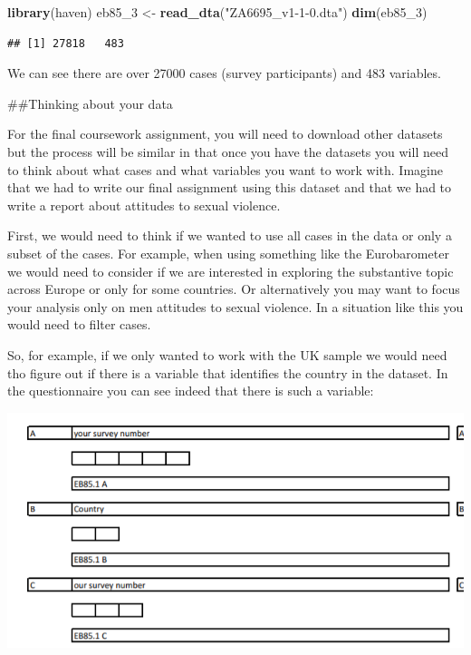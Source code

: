 \documentclass[]{book}
\newenvironment{Shaded}{\begin{snugshade}}{\end{snugshade}}
\newcommand{\DecValTok}[1]{\textcolor[rgb]{0.00,0.00,0.81}{#1}}
\newcommand{\KeywordTok}[1]{\textcolor[rgb]{0.13,0.29,0.53}{\textbf{#1}}}
\newcommand{\NormalTok}[1]{#1}
\newcommand{\StringTok}[1]{\textcolor[rgb]{0.31,0.60,0.02}{#1}}
\theoremstyle{definition}
\theoremstyle{definition}
\theoremstyle{definition}
\theoremstyle{remark}
\begin{document}
\begin{Shaded}
\begin{Highlighting}[]
\KeywordTok{library}\NormalTok{(haven)}
\NormalTok{eb85_}\DecValTok{3}\NormalTok{ <-}\StringTok{ }\KeywordTok{read_dta}\NormalTok{(}\StringTok{"ZA6695_v1-1-0.dta"}\NormalTok{)}
\KeywordTok{dim}\NormalTok{(eb85_}\DecValTok{3}\NormalTok{)}
\end{Highlighting}
\end{Shaded}

\begin{verbatim}
## [1] 27818   483
\end{verbatim}

We can see there are over 27000 cases (survey participants) and 483
variables.

\#\#Thinking about your data

For the final coursework assignment, you will need to download other
datasets but the process will be similar in that once you have the
datasets you will need to think about what cases and what variables you
want to work with. Imagine that we had to write our final assignment
using this dataset and that we had to write a report about attitudes to
sexual violence.

First, we would need to think if we wanted to use all cases in the data
or only a subset of the cases. For example, when using something like
the Eurobarometer we would need to consider if we are interested in
exploring the substantive topic across Europe or only for some
countries. Or alternatively you may want to focus your analysis only on
men attitudes to sexual violence. In a situation like this you would
need to filter cases.

So, for example, if we only wanted to work with the UK sample we would
need tho figure out if there is a variable that identifies the country
in the dataset. In the questionnaire you can see indeed that there is
such a variable:

\includegraphics{imgs/question1.PNG}
\end{document}
